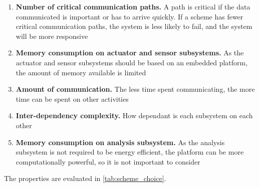 \begin{enumerate}
\item \textbf{Number of critical communication paths.} A path is critical if the data communicated is important or has to arrive quickly. If a scheme has fewer critical communication paths, the system is less likely to fail, and the system will be more responsive
\item \textbf{Memory consumption on actuator and sensor subsystems.} As the actuator and sensor subsystems should be based on an embedded platform, the amount of memory available is limited
\item \textbf{Amount of communication.} The less time spent communicating, the more time can be spent on other activities
\item \textbf{Inter-dependency complexity.} How dependant is each subsystem on each other 
\item \textbf{Memory consumption on analysis subsystem.} As the analysis subsystem is not required to be energy efficient, the platform can be more computationally powerful, so it is not important to consider
\end{enumerate}

The properties are evaluated in \cref{tab:scheme_choice}. 

